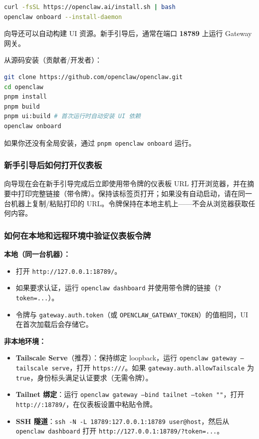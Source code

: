 \begin{lstlisting}[language=bash]
curl -fsSL https://openclaw.ai/install.sh | bash
openclaw onboard --install-daemon
\end{lstlisting}


向导还可以自动构建 UI 资源。新手引导后，通常在端口 \textbf{18789} 上运行 Gateway 网关。

从源码安装（贡献者/开发者）：

\begin{lstlisting}[language=bash]
git clone https://github.com/openclaw/openclaw.git
cd openclaw
pnpm install
pnpm build
pnpm ui:build # 首次运行时自动安装 UI 依赖
openclaw onboard
\end{lstlisting}


如果你还没有全局安装，通过 \texttt{pnpm openclaw onboard} 运行。

\subsubsection{新手引导后如何打开仪表板}


向导现在会在新手引导完成后立即使用带令牌的仪表板 URL 打开浏览器，并在摘要中打印完整链接（带令牌）。保持该标签页打开；如果没有自动启动，请在同一台机器上复制/粘贴打印的 URL。令牌保持在本地主机上——不会从浏览器获取任何内容。

\subsubsection{如何在本地和远程环境中验证仪表板令牌}


\textbf{本地（同一台机器）：}

\begin{itemize}
  \item 打开 \texttt{http://127.0.0.1:18789/}。
  \item 如果要求认证，运行 \texttt{openclaw dashboard} 并使用带令牌的链接（\texttt{?token=...}）。
  \item 令牌与 \texttt{gateway.auth.token}（或 \texttt{OPENCLAW\_GATEWAY\_TOKEN}）的值相同，UI 在首次加载后会存储它。
\end{itemize}


\textbf{非本地环境：}

\begin{itemize}
  \item \textbf{Tailscale Serve}（推荐）：保持绑定 loopback，运行 \texttt{openclaw gateway --tailscale serve}，打开 \texttt{https:///}。如果 \texttt{gateway.auth.allowTailscale} 为 \texttt{true}，身份标头满足认证要求（无需令牌）。
  \item \textbf{Tailnet 绑定}：运行 \texttt{openclaw gateway --bind tailnet --token ""}，打开 \texttt{http://:18789/}，在仪表板设置中粘贴令牌。
  \item \textbf{SSH 隧道}：\texttt{ssh -N -L 18789:127.0.0.1:18789 user@host}，然后从 \texttt{openclaw dashboard} 打开 \texttt{http://127.0.0.1:18789/?token=...}。
\end{itemize}


